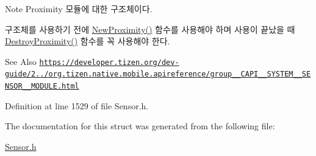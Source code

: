 \begin{DoxyNote}{Note}
Proximity 모듈에 대한 구조체이다. \par
 구조체를 사용하기 전에 \hyperlink{Sensor_8h_adb707c0710a6913565dda16b69559940}{New\-Proximity()} 함수를 사용해야 하며 사용이 끝났을 때 \hyperlink{Sensor_8h_a826d9c3073df9e3332c8f6110bb3f991}{Destroy\-Proximity()} 함수를 꼭 사용해야 한다. 
\end{DoxyNote}
\begin{DoxySeeAlso}{See Also}
\href{https://developer.tizen.org/dev-guide/2.3.0/org.tizen.native.mobile.apireference/group__CAPI__SYSTEM__SENSOR__MODULE.html}{\tt https\-://developer.\-tizen.\-org/dev-\/guide/2../org.\-tizen.\-native.\-mobile.\-apireference/group\-\_\-\-\_\-\-C\-A\-P\-I\-\_\-\-\_\-\-S\-Y\-S\-T\-E\-M\-\_\-\-\_\-\-S\-E\-N\-S\-O\-R\-\_\-\-\_\-\-M\-O\-D\-U\-L\-E.\-html} 
\end{DoxySeeAlso}


Definition at line 1529 of file Sensor.\-h.



The documentation for this struct was generated from the following file\-:\begin{DoxyCompactItemize}
\item 
\hyperlink{Sensor_8h}{Sensor.\-h}\end{DoxyCompactItemize}
